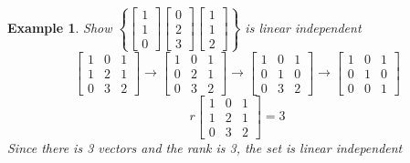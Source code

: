 \documentclass{article}
\newtheorem{ex}[theorem]{Example}
\begin{document}
\begin{ex}
Show \( \left\{ \begin{bmatrix} 1 \\ 1 \\ 0 \end{bmatrix} \begin{bmatrix} 0 \\ 2 \\ 3 \end{bmatrix} \begin{bmatrix} 1 \\ 1 \\ 2 \end{bmatrix} \right\} \) is linear independent \\
\[\begin{bmatrix} 1 & 0 & 1 \\ 1 & 2 & 1 \\ 0 & 3 & 2\end{bmatrix} \rightarrow \begin{bmatrix} 1 & 0 & 1 \\ 0 & 2 & 1 \\ 0 & 3 & 2\end{bmatrix}\rightarrow \begin{bmatrix} 1 & 0 & 1 \\ 0 & 1 & 0 \\ 0 & 3 & 2\end{bmatrix}  \rightarrow \begin{bmatrix} 1 & 0 & 1 \\ 0 & 1 & 0 \\ 0 & 0 & 1\end{bmatrix} \]
\[ r \begin{bmatrix} 1 & 0 & 1 \\ 1 & 2 & 1 \\ 0 & 3 & 2\end{bmatrix}  = 3\]
Since there is 3 vectors and the rank is 3, the set is linear independent
\end{ex}
\end{document}
